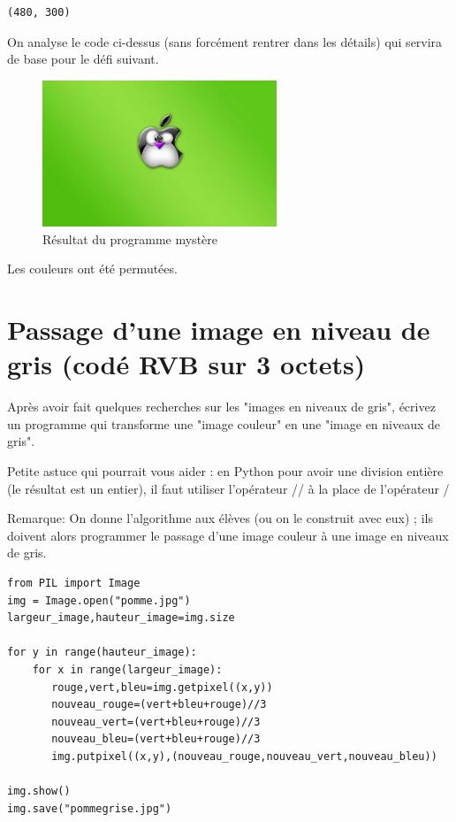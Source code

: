 \documentclass[11pt]{article}
\begin{document}
\begin{verbatim}
(480, 300)
\end{verbatim}


On analyse le code ci-dessus (sans forcément rentrer dans les détails) qui servira de base pour le défi suivant.

\begin{figure}[htbp]
\centering
\includegraphics[width=7cm]{pommeMystere.jpg}
\caption{Résultat du programme mystère}
\end{figure}

Les couleurs ont été permutées.


\section{Passage d'une image en niveau de gris (codé RVB sur 3 octets)}
\label{sec:org58204ed}

Après avoir fait quelques recherches sur les "images en niveaux de gris", écrivez un programme qui transforme une "image couleur" en une "image en niveaux de gris".

Petite astuce qui pourrait vous aider : en Python pour avoir une division entière (le résultat est un entier), il faut utiliser l'opérateur // à la place de l'opérateur / 

Remarque: On donne l'algorithme aux élèves (ou on le construit avec eux) ; ils doivent alors programmer le passage d'une image couleur à une image en niveaux de gris.


\begin{verbatim}
from PIL import Image
img = Image.open("pomme.jpg")
largeur_image,hauteur_image=img.size

for y in range(hauteur_image):
    for x in range(largeur_image):
       rouge,vert,bleu=img.getpixel((x,y))
       nouveau_rouge=(vert+bleu+rouge)//3
       nouveau_vert=(vert+bleu+rouge)//3
       nouveau_bleu=(vert+bleu+rouge)//3
       img.putpixel((x,y),(nouveau_rouge,nouveau_vert,nouveau_bleu))

img.show()
img.save("pommegrise.jpg")
\end{verbatim}
\end{document}
